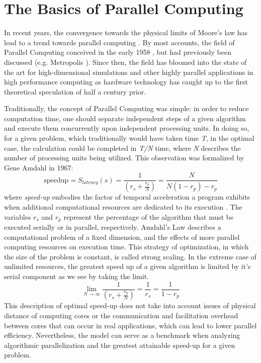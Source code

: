 \section{The Basics of Parallel Computing}
In recent years, the convergence towards the physical limits of Moore's law has lead to a
trend towards parallel computing \cite{Kumar,Markov}.  By most accounts, the
field of Parallel Computing conceived in the early 1958 \cite{Gill}, but had previously
been discussed (e.g. Metropolis \cite{Metropolis}). Since then, the field has
 bloomed into the state of the art for high-dimensional simulations and
 other highly parallel applications in
high performance computing as hardware technology has caught up to the first
theoretical speculation of half a century prior. \par

Traditionally, the concept of Parallel Computing was simple: in order to
reduce computation time, one should separate independent steps of a given algorithm
and execute them concurrently upon independent processing units.  In doing so, for a given
problem, which traditionally would have taken time \textit{T}, in the optimal case,
the calculation could be completed in \textit{T/N} time, where \textit{N} describes
the number of processing units being utilized.  This observation was formalized
by Gene Amdahl in 1967:
%
\begin{equation}
  \tag{Amdahl's Law}
  \text{speedup} = S_{latency}(s)= \frac{1}{(r_{s} + \frac{r_{p}}{N})} = \frac{N}{N(1-r_{p})-r_{p}}
  \label{egn:Amdahl}
\end{equation}
%
where \textit{\gls{speed-up}} embodies the factor of temporal acceleration a program
exhibits when additional computational resources are dedicated to its execution \cite{Wilt}.
The variables \textit{$r_{s}$} and \textit{$ r_{p} $} represent the percentage of
 the algorithm that must be executed serially or in parallel, respectively.
   Amdahl's Law describes a computational problem of a fixed dimension,
and the effects of more parallel computing resources on execution time.
This strategy of optimization, in which the size of the problem is constant,
 is called strong scaling.
In the extreme case of unlimited resources, the greatest speed up of a given algorithm
 is limited by it's serial component as we see by taking the limit.
%
\begin{equation}
 \lim_{N\to\infty}  \frac{1}{(r_{s} + \frac{r_{p}}{N})} = \frac{1}{r_{s}} = \frac{1}{1-r_{p}}
\end{equation}
%
This description of optimal \gls{speed-up} does not take into account issues of physical
distance of computing cores or the communication and facilitation overhead between
cores that can occur in real applications, which can lead to lower parallel efficiency.
Nevertheless, the model can serve as a benchmark when analyzing algorithmic
parallelization and the greatest attainable speed-up for a given problem.\par

